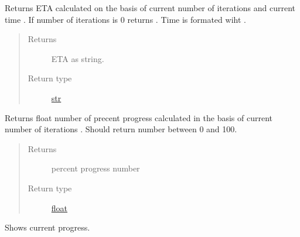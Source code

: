 \documentclass[a4paper,10pt,english]{sphinxmanual}
\begin{document}
\begin{fulllineitems}

\begin{fulllineitems}
\label{aqueduct.utils.clui:aqueduct.utils.clui.SimpleProgressBar.ETA}
Returns ETA calculated on the basis of current number of iterations
 and current time . If number of
iterations is 0 returns .
Time is formated wiht {\hyperref[aqueduct.utils.clui:aqueduct.utils.clui.smart_time_string]{}}.
\begin{quote}\begin{description}
\item[{Returns}] \leavevmode
ETA as string.

\item[{Return type}] \leavevmode
\href{http://docs.python.org/2/library/functions.html\#str}{str}

\end{description}\end{quote}

\end{fulllineitems}


\begin{fulllineitems}
\label{aqueduct.utils.clui:aqueduct.utils.clui.SimpleProgressBar.percent}
Returns float number of precent progress calculated in the basis
of current number of iterations . Should return
number between 0 and 100.
\begin{quote}\begin{description}
\item[{Returns}] \leavevmode
percent progress number

\item[{Return type}] \leavevmode
\href{http://docs.python.org/2/library/functions.html\#float}{float}

\end{description}\end{quote}

\end{fulllineitems}


\begin{fulllineitems}
\label{aqueduct.utils.clui:aqueduct.utils.clui.SimpleProgressBar.show}
Shows current progress.


\end{fulllineitems}
\end{fulllineitems}
\end{document}
